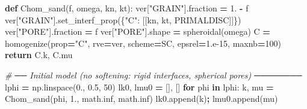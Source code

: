 \documentclass[
  a4paper,
  numbers=noendperiod,
  DIV=12]{scrreprt}
\newenvironment{Shaded}{\begin{snugshade}}{\end{snugshade}}
\newcommand{\CommentTok}[1]{\textcolor[rgb]{0.56,0.35,0.01}{\textit{#1}}}
\newcommand{\ControlFlowTok}[1]{\textcolor[rgb]{0.13,0.29,0.53}{\textbf{#1}}}
\newcommand{\DecValTok}[1]{\textcolor[rgb]{0.00,0.00,0.81}{#1}}
\newcommand{\FloatTok}[1]{\textcolor[rgb]{0.00,0.00,0.81}{#1}}
\newcommand{\KeywordTok}[1]{\textcolor[rgb]{0.13,0.29,0.53}{\textbf{#1}}}
\newcommand{\NormalTok}[1]{#1}
\newcommand{\OperatorTok}[1]{\textcolor[rgb]{0.81,0.36,0.00}{\textbf{#1}}}
\newcommand{\StringTok}[1]{\textcolor[rgb]{0.31,0.60,0.02}{#1}}
\begin{document}
\begin{tcolorbox}
\begin{Shaded}
\begin{Highlighting}[]
\KeywordTok{def}\NormalTok{ Chom\_sand(f, omega, kn, kt):}
\NormalTok{    ver[}\StringTok{"GRAIN"}\NormalTok{].fraction }\OperatorTok{=} \FloatTok{1.} \OperatorTok{{-}}\NormalTok{ f}
\NormalTok{    ver[}\StringTok{"GRAIN"}\NormalTok{].set\_interf\_prop(\{}\StringTok{"C"}\NormalTok{: [[kn, kt, PRIMALDISC]]\})}
\NormalTok{    ver[}\StringTok{"PORE"}\NormalTok{].fraction }\OperatorTok{=}\NormalTok{ f}
\NormalTok{    ver[}\StringTok{"PORE"}\NormalTok{].shape }\OperatorTok{=}\NormalTok{ spheroidal(omega)}
\NormalTok{    C }\OperatorTok{=}\NormalTok{ homogenize(prop}\OperatorTok{=}\StringTok{"C"}\NormalTok{, rve}\OperatorTok{=}\NormalTok{ver, scheme}\OperatorTok{=}\NormalTok{SC, epsrel}\OperatorTok{=}\FloatTok{1.e{-}15}\NormalTok{, maxnb}\OperatorTok{=}\DecValTok{100}\NormalTok{)}
    \ControlFlowTok{return}\NormalTok{ C.k, C.mu}

\CommentTok{\# ── Initial model (no softening: rigid interfaces, spherical pores) ────────}
\NormalTok{lphi }\OperatorTok{=}\NormalTok{ np.linspace(}\FloatTok{0.}\NormalTok{, }\FloatTok{0.5}\NormalTok{, }\DecValTok{50}\NormalTok{)}
\NormalTok{lk0, lmu0 }\OperatorTok{=}\NormalTok{ [], []}
\ControlFlowTok{for}\NormalTok{ phi }\KeywordTok{in}\NormalTok{ lphi:}
\NormalTok{    k, mu }\OperatorTok{=}\NormalTok{ Chom\_sand(phi, }\FloatTok{1.}\NormalTok{, math.inf, math.inf)}
\NormalTok{    lk0.append(k)}\OperatorTok{;}\NormalTok{ lmu0.append(mu)}


\end{Highlighting}
\end{Shaded}
\end{tcolorbox}
\end{document}

